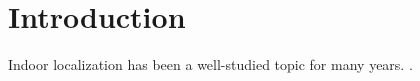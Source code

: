 \section{Introduction}
\label{sec:introduction}

Indoor localization has been a well-studied topic for many years.
\cite{JensenEtAl:11:Lab}.


